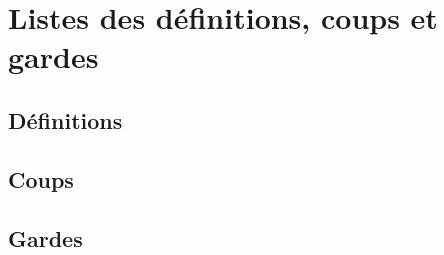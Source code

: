 \chapter{Listes des définitions, coups et gardes}
\label{app:listes}




\section{Définitions}




\section{Coups}




\section{Gardes}


